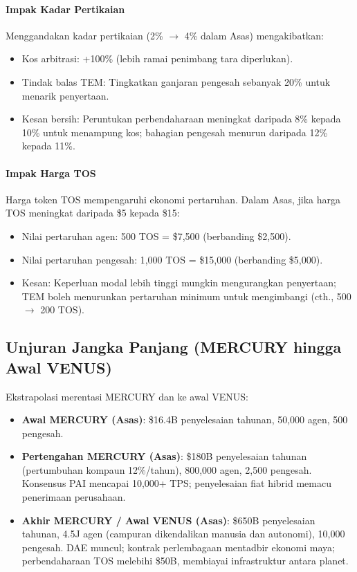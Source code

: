 \documentclass[11pt]{article}
\begin{document}
\paragraph{Impak Kadar Pertikaian}
Menggandakan kadar pertikaian (2\% $\to$ 4\% dalam Asas) mengakibatkan:
\begin{itemize}[noitemsep]
  \item Kos arbitrasi: +100\% (lebih ramai penimbang tara diperlukan).
  \item Tindak balas TEM: Tingkatkan ganjaran pengesah sebanyak 20\% untuk menarik penyertaan.
  \item Kesan bersih: Peruntukan perbendaharaan meningkat daripada 8\% kepada 10\% untuk menampung kos; bahagian pengesah menurun daripada 12\% kepada 11\%.
\end{itemize}

\paragraph{Impak Harga TOS}
Harga token TOS mempengaruhi ekonomi pertaruhan. Dalam Asas, jika harga TOS meningkat daripada \$5 kepada \$15:
\begin{itemize}[noitemsep]
  \item Nilai pertaruhan agen: 500 TOS = \$7{,}500 (berbanding \$2{,}500).
  \item Nilai pertaruhan pengesah: 1,000 TOS = \$15{,}000 (berbanding \$5{,}000).
  \item Kesan: Keperluan modal lebih tinggi mungkin mengurangkan penyertaan; TEM boleh menurunkan pertaruhan minimum untuk mengimbangi (cth., 500 $\to$ 200 TOS).
\end{itemize}

\subsection{Unjuran Jangka Panjang (MERCURY hingga Awal VENUS)}
Ekstrapolasi merentasi MERCURY dan ke awal VENUS:
\begin{itemize}[noitemsep]
  \item \textbf{Awal MERCURY (Asas)}: \$16.4B penyelesaian tahunan, 50,000 agen, 500 pengesah.
  \item \textbf{Pertengahan MERCURY (Asas)}: \$180B penyelesaian tahunan (pertumbuhan kompaun 12\%/tahun), 800,000 agen, 2,500 pengesah. Konsensus PAI mencapai 10,000+ TPS; penyelesaian fiat hibrid memacu penerimaan perusahaan.
  \item \textbf{Akhir MERCURY / Awal VENUS (Asas)}: \$650B penyelesaian tahunan, 4.5J agen (campuran dikendalikan manusia dan autonomi), 10,000 pengesah. DAE muncul; kontrak perlembagaan mentadbir ekonomi maya; perbendaharaan TOS melebihi \$50B, membiayai infrastruktur antara planet.
\end{itemize}
\end{document}

